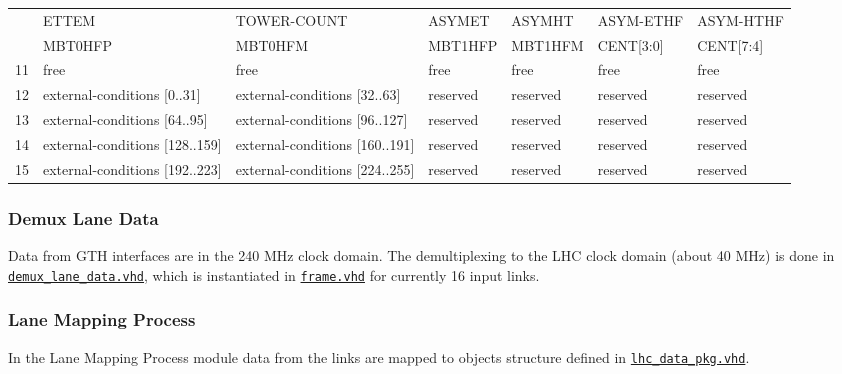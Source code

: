 \begin{table}
\begin{tabular}{c|m{}|m{}|m{}|m{}|m{}|m{}|}
\multicolumn{1}{|c|}{} &
\multicolumn{1}{l|}{ETTEM} & TOWER-COUNT & ASYMET & ASYMHT & ASYM-ETHF & ASYM-HTHF \\
\multicolumn{1}{|c|}{} &
\multicolumn{1}{l|}{MBT0HFP} & MBT0HFM & MBT1HFP & MBT1HFM & CENT[3:0] & CENT[7:4] \\\hline
\multicolumn{1}{|c|}{11} & free & free & free & free & free & free \\\hline
\multicolumn{1}{|c|}{12} & external-conditions [0..31] & external-conditions [32..63] & reserved & reserved & reserved & reserved \\\hline
\multicolumn{1}{|c|}{13} & external-conditions [64..95] & external-conditions [96..127] & reserved & reserved & reserved & reserved \\\hline
\multicolumn{1}{|c|}{14} & external-conditions [128..159] & external-conditions [160..191] & reserved & reserved & reserved & reserved \\\hline
\multicolumn{1}{|c|}{15} & external-conditions [192..223] & external-conditions [224..255] & reserved & reserved & reserved & reserved \\\hline
\end{tabular}
\label{tab:framework:tab_configuration_optical_conn}
\end{table}

\clearpage

%
%

\subsubsection{Demux Lane Data} \label{sec:framework:demux_lane_data}
Data from GTH interfaces are in the 240 MHz clock domain. The demultiplexing to the LHC clock domain (about 40 MHz) is done in \href{\gitbranch/firmware/hdl/payload/frame/demux_lane_data.vhd}{\texttt{\textquotesingle demux\_lane\_data.vhd\textquotesingle }}, which is instantiated in \href{\gitbranch/firmware/hdl/payload/frame.vhd}{\texttt{\textquotesingle frame.vhd\textquotesingle }} for currently 16 input links.

%
%

\subsubsection{Lane Mapping Process} \label{sec:framework:lmp}
In the Lane Mapping Process module data from the links are mapped to objects structure defined in \href{\gitbranch/firmware/hdl/packages/lhc_data_pkg.vhd}{\texttt{\textquotesingle lhc\_data\_pkg.vhd\textquotesingle }}.


